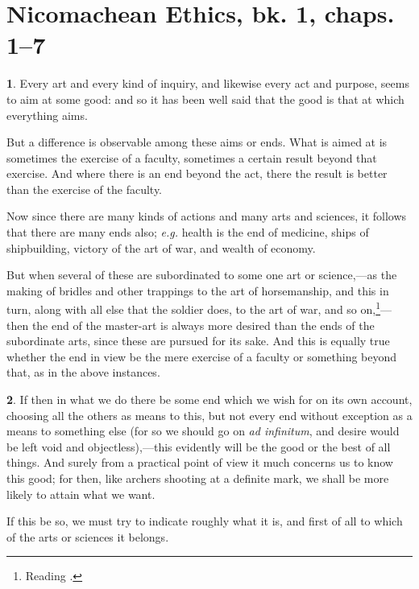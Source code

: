 
\author{Aristotle}
\chapter[Aristotle -- Nicomachean Ethics, bk. 1, chaps.
1--7]{Nicomachean Ethics, bk. 1, chaps. 1--7}


\textbf{1}. Every art and every kind of inquiry, and likewise
every act and purpose, seems to aim at some good: and so it has been
well said that the good is that at which everything aims.

But a difference is observable among these aims or ends. What is aimed
at is sometimes the exercise of a faculty, sometimes a certain result
beyond that exercise. And where there is an end beyond the act, there
the result is better than the exercise of the faculty.

Now since there are many kinds of actions and many arts and sciences,
it follows that there are many ends also; \textit{e.g.} health is the
end of medicine, ships of shipbuilding, victory of the art of war, and
wealth of economy.

But when several of these are subordinated to  some one art or
science,---as the making of bridles and other trappings to the art of
horsemanship, and this in turn, along with all else that the soldier
does, to the art of war, and so on,\footnote{Reading .}---then the end of the master-art is always more desired than the
ends of the subordinate arts, since these are pursued for its sake.
And this is equally true whether the end in view be the mere exercise
of a faculty or something beyond that, as in the above instances.

\textbf{2}. If then in what we do there be some end which we wish for
on its own account, choosing all the others as means to this, but not
every end without exception as a means to something else (for so we
should go on \textit{ad infinitum}, and desire would be left void and
objectless),---this evidently will be the good or the best of all
things. And surely from a practical point of view it much concerns us
to know this good; for then, like archers shooting at a definite mark,
we shall be more likely to attain what we want.

If this be so, we must try to indicate roughly what it is, and first
of all to which of the arts or sciences it belongs.

